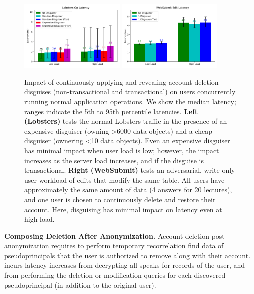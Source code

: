 \begin{figure}[t]
    \centering
        \includegraphics[width=0.45\textwidth]{figs/lobsters_concurrent_results}
        \includegraphics[width=0.45\textwidth]{figs/websubmit_concurrent_results}
    \caption{Impact of continuously applying and revealing account deletion disguises (non-transactional and transactional) on users concurrently running
    normal application operations. We show the median latency; ranges indicate the 5th to 95th
    percentile latencies.
    \textbf{Left (Lobsters)} tests the normal Lobsters traffic in the presence of an expensive
    disguiser (owning >6000 data objects) and a cheap disguiser (ownering <10 data objects). Even an expensive disguiser has minimal impact when user load is low; however, the impact increases as the server load increases, and if the
    disguise is transactional.
    \textbf{Right (WebSubmit)} tests an adversarial, write-only user workload of edits that
    modify the same table. All users have approximately the same amount of data (4 answers for 20
    lectures), and one user is chosen to continuously delete and restore their account. Here,
    disguising has minimal impact on latency even at high load.
    }
    \label{fig:concurrent}
\end{figure}

\textbf{Composing Deletion After Anonymization.}
Account deletion post-anonymization requires \sys to perform temporary recorrelation find data of
pseudoprincipals that the user is authorized to remove along with their account. \sys incurs latency
increases from decrypting all speaks-for records of the user, and from performing the deletion or
modification queries for each discovered pseudoprincipal (in addition to the original user).

